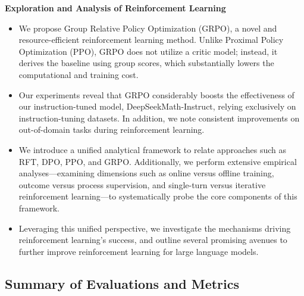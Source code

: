 \textbf{Exploration and Analysis of Reinforcement Learning}

\begin{itemize}[topsep=0pt]
    \item We propose Group Relative Policy Optimization (GRPO), a novel and resource-efficient reinforcement learning method. Unlike Proximal Policy Optimization (PPO), GRPO does not utilize a critic model; instead, it derives the baseline using group scores, which substantially lowers the computational and training cost.
    \item Our experiments reveal that GRPO considerably boosts the effectiveness of our instruction-tuned model, DeepSeekMath-Instruct, relying exclusively on instruction-tuning datasets. In addition, we note consistent improvements on out-of-domain tasks during reinforcement learning.
    \item We introduce a unified analytical framework to relate approaches such as RFT, DPO, PPO, and GRPO. Additionally, we perform extensive empirical analyses—examining dimensions such as online versus offline training, outcome versus process supervision, and single-turn versus iterative reinforcement learning—to systematically probe the core components of this framework.
    \item Leveraging this unified perspective, we investigate the mechanisms driving reinforcement learning’s success, and outline several promising avenues to further improve reinforcement learning for large language models.
\end{itemize}

\subsection{Summary of Evaluations and Metrics}

